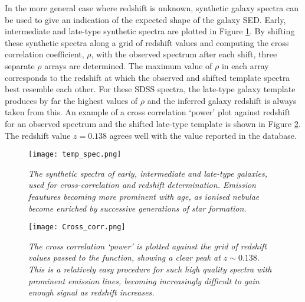 \documentclass{literature}
\begin{document}
In the more general case where redshift is unknown, synthetic galaxy spectra can be used to give an indication of the expected shape of the galaxy SED. Early, intermediate and late-type synthetic spectra are plotted in Figure \ref{fig:temp_spec}. By shifting these synthetic spectra along a grid of redshift values and computing the cross correlation coefficient, $\rho$, with the observed spectrum after each shift, three separate $\rho$ arrays are determined. The maximum value of $\rho$ in each array corresponds to the redshift at which the observed and shifted template spectra best resemble each other. For these SDSS spectra, the late-type galaxy template produces by far the highest values of $\rho$ and the inferred galaxy redshift is always taken from this. An example of a cross correlation `power' plot against redshift for an observed spectrum and the shifted late-type template is shown in Figure \ref{fig:cross_cor}. The redshift value $z = 0.138$ agrees well with the value reported in the database.    \\ 




\begin{figure}[!htp]
\centering
\texttt{[image: temp\_spec.png]}
\caption{\footnotesize{\emph{The synthetic spectra of early, intermediate and late-type galaxies, used for cross-correlation and redshift determination. Emission feautures becoming more prominent with age, as ionised nebulae become enriched by successive generations of star formation.}}}
\label{fig:temp_spec}
\end{figure} 

\begin{figure}[!htp]
\centering
\texttt{[image: Cross\_corr.png]}
\caption{\footnotesize{\emph{The cross correlation `power' is plotted against the grid of redshift values passed to the function, showing a clear peak at $z\sim 0.138$. This is a relatively easy procedure for such high quality spectra with prominent emission lines, becoming increasingly difficult to gain enough signal as redshift increases. }}}
\label{fig:cross_cor}
\end{figure} 
\end{document}
